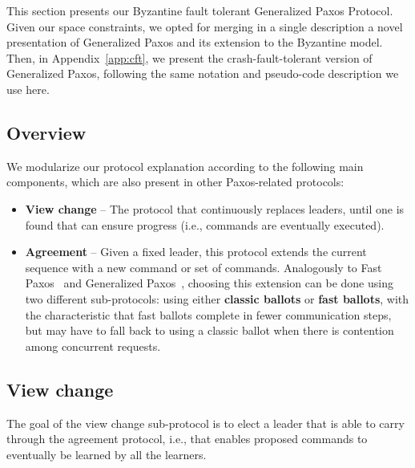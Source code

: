 This section presents our Byzantine fault tolerant Generalized Paxos
Protocol. Given our space constraints, we opted for merging in a
single description a novel presentation of Generalized Paxos and its
extension to the Byzantine model. Then, in Appendix~\ref{app:cft}, we
present the crash-fault-tolerant version of Generalized Paxos,
following the same notation and pseudo-code description we use here.

\subsection{Overview}

We modularize our protocol explanation according to the following main components, which are also present in other Paxos-related protocols:

\begin{itemize}

\item
{\bf View change} -- The protocol that continuously replaces leaders, until one is found that can ensure progress (i.e., commands are eventually executed).

\item
{\bf Agreement} -- Given a fixed leader, this protocol extends the current sequence with a new command or set of commands. Analogously to Fast Paxos~\cite{L06} and Generalized Paxos~\cite{Lamport2005}, choosing this extension can be done using two different sub-protocols: using either {\bf classic ballots} or {\bf fast ballots}, with the characteristic that fast ballots complete in fewer communication steps, but may have to fall back to using a classic ballot when there is contention among concurrent requests.

\end{itemize}

\subsection{View change} 

The goal of the view change sub-protocol is to elect a leader that is able to carry through the agreement protocol, i.e., that enables proposed commands to eventually be learned by all the learners.

